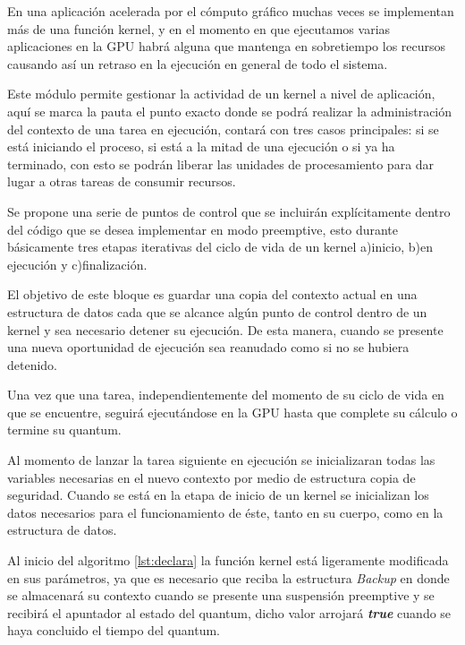 
En una aplicación acelerada por el cómputo gráfico muchas veces se implementan más de una función kernel, y en el momento en que ejecutamos varias aplicaciones en la GPU habrá alguna que mantenga en sobretiempo los recursos causando así un retraso en la ejecución en general de todo el sistema.
\newline

Este módulo permite gestionar la actividad de un kernel a nivel de aplicación, aquí se marca la pauta el punto exacto donde se podrá realizar la administración del contexto de una tarea en ejecución, contará con tres casos principales: si se está iniciando el proceso, si está a la mitad de una ejecución o si ya ha terminado, con esto se podrán liberar las unidades de procesamiento para dar lugar a otras tareas de consumir recursos.
\newline

Se propone una serie de puntos de control que se incluirán explícitamente dentro del código que se desea implementar en modo preemptive, esto durante básicamente tres etapas iterativas del ciclo de vida de un kernel a)inicio, b)en ejecución y c)finalización. 
\newline

El objetivo de este bloque es guardar una copia del contexto actual en una estructura de datos cada que se alcance algún punto de control dentro de un kernel y sea necesario detener su ejecución. De esta manera, cuando se  presente una nueva oportunidad de ejecución sea reanudado como si no se hubiera detenido.
\newline

Una vez que una tarea, independientemente del momento de su ciclo de vida en que se encuentre, seguirá ejecutándose en la GPU hasta que complete su cálculo o termine su quantum.
\newline

Al momento de lanzar la tarea siguiente en ejecución se inicializaran todas las variables necesarias en el nuevo contexto por medio de estructura copia de seguridad. Cuando se está en la etapa de inicio de un kernel se inicializan los datos necesarios para el funcionamiento de éste, tanto en su cuerpo, como  en la estructura de datos.
\newline

Al inicio del algoritmo \ref{lst:declara} la función kernel está ligeramente modificada en sus parámetros, ya que es necesario que reciba la estructura \textit{Backup} en donde se almacenará su contexto cuando se presente una suspensión preemptive y se recibirá el apuntador al estado del quantum, dicho valor arrojará \textbf{\textit{true}} cuando se haya concluido el tiempo del quantum.
\newline

